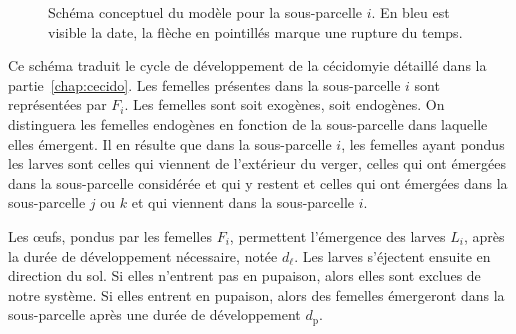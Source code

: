 \begin{figure}[ht]
 \caption{Schéma conceptuel du modèle pour la sous-parcelle $i$. En bleu est visible la date, la flèche en pointillés marque une rupture du temps.}
 \label{fig:schema}
\end{figure}

Ce schéma traduit le cycle de développement de la cécidomyie détaillé dans la partie~\ref{chap:cecido}.
Les femelles présentes dans la sous-parcelle $i$ sont représentées par $F_i$.
Les femelles sont soit exogènes, soit endogènes.
On distinguera les femelles endogènes en fonction de la sous-parcelle dans laquelle elles émergent.
Il en résulte que dans la sous-parcelle $i$, les femelles ayant pondus les larves sont celles qui viennent de l'extérieur du verger, celles qui ont émergées dans la sous-parcelle considérée et qui y restent et celles qui ont émergées dans la sous-parcelle $j$ ou $k$ et qui viennent dans la sous-parcelle $i$.

Les œufs, pondus par les femelles $F_i$, permettent l'émergence des larves $L_i$, après la durée de développement nécessaire, notée $d_{\ell}$.
Les larves s'éjectent ensuite en direction du sol.
Si elles n'entrent pas en pupaison, alors elles sont exclues de notre système.
Si elles entrent en pupaison, alors des femelles émergeront dans la sous-parcelle après une durée de développement $d_{\text{p}}$.

